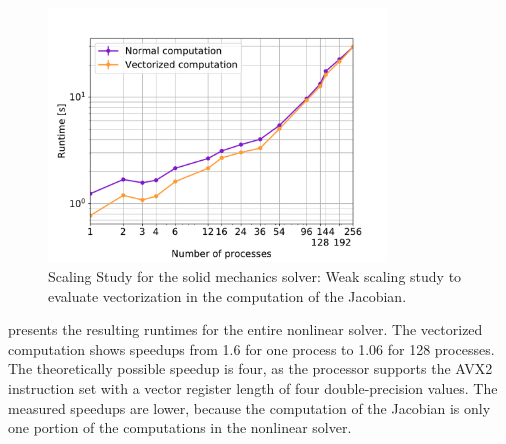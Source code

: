 \begin{figure}
  \centering%
  \includegraphics[width=0.8\textwidth]{images/results/studies/vectorized.pdf}%
  \caption{Scaling Study for the solid mechanics solver: Weak scaling study to evaluate vectorization in the computation of the Jacobian.}%
  \label{fig:vectorized_jacobian}%
\end{figure}

 presents the resulting runtimes for the entire nonlinear solver. 
The vectorized computation shows speedups from \num{1.6} for one process to \num{1.06} for 128 processes. The theoretically possible speedup is four, as the processor supports the AVX2 instruction set with a vector register length of four double-precision values. The measured speedups are lower, because the computation of the Jacobian is only one portion of the computations in the nonlinear solver. 

